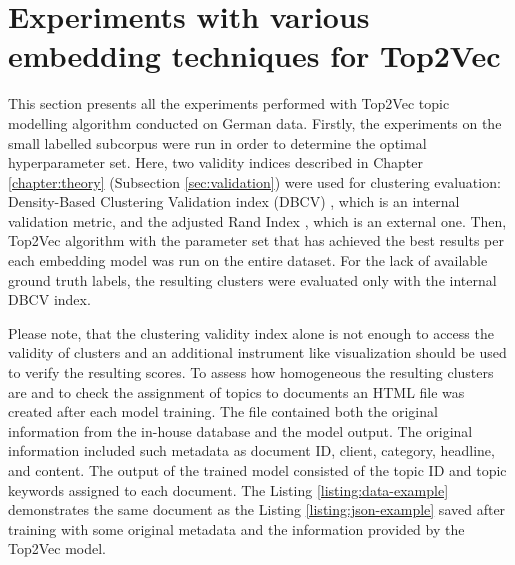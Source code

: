 \documentclass[fontsize=12pt,a4paper,twoside,openany]{scrbook}
\begin{document}
\section{Experiments with various embedding techniques for Top2Vec}
\label{sec:exp}

This section presents all the experiments performed with Top2Vec topic modelling algorithm conducted on German data. Firstly, the experiments on the small labelled subcorpus were run in order to determine the optimal hyperparameter set. Here, two validity indices described in Chapter \ref{chapter:theory} (Subsection \ref{sec:validation}) were used for clustering evaluation: Density-Based Clustering Validation index (DBCV) \parencite{Moulavi14}, which is an internal validation metric, and the adjusted Rand Index \parencite{Hubert85}, which is an external one. Then, Top2Vec algorithm with the parameter set that has achieved the best results per each embedding model was run on the entire dataset. For the lack of available ground truth labels, the resulting clusters were evaluated only with the internal DBCV index.

Please note, that the clustering validity index alone is not enough to access the validity of clusters and an additional instrument like visualization should be used \parencite{Halkidi01b} to verify the resulting scores. To assess how homogeneous the resulting clusters are and to check the assignment of topics to documents an HTML file was created after each model training. The file contained both the original information from the in-house database and the model output. The original information included such metadata as document ID, client, category, headline, and content. The output of the trained model consisted of the topic ID and topic keywords assigned to each document. The Listing \ref{listing:data-example} demonstrates the same document as the Listing \ref{listing:json-example} saved after training with some original metadata and the information provided by the Top2Vec model.
\end{document}
